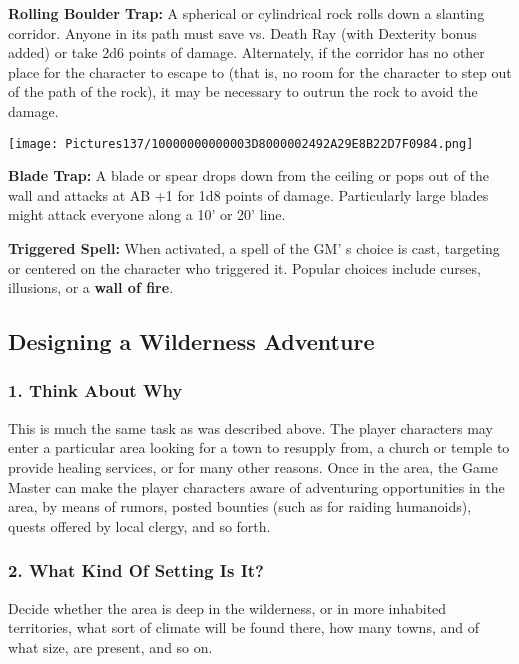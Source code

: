\documentclass[a4paper,twoside,openany,10pt]{book}
\begin{document}
\begin{multicols}{2}
\textbf{Rolling Boulder Trap:} A spherical or cylindrical rock rolls down a slanting corridor. Anyone in its path must save vs. Death Ray (with Dexterity bonus added) or take 2d6 points of damage. Alternately, if the corridor has no other place for the character to escape to (that is, no room for the character to step out of the path of the rock), it may be necessary to outrun the rock to avoid the damage.

\begin{center}
	\texttt{[image: Pictures137/10000000000003D8000002492A29E8B22D7F0984.png]}
\end{center}

\textbf{Blade Trap:} A blade or spear drops down from the ceiling or pops out of the wall and attacks at AB +1 for 1d8 points of damage. Particularly large blades might attack everyone along a 10' or 20' line.

\textbf{Triggered Spell:} When activated, a spell of the GM' s choice is cast, targeting or centered on the character who triggered it. Popular choices include curses, illusions, or a \textbf{wall of fire}.

\subsection{Designing a Wilderness Adventure}\label{designing-a-wilderness-adventure}

\subsubsection{1. Think About Why}\label{think-about-why-1}

This is much the same task as was described above. The player characters may enter a particular area looking for a town to resupply from, a church or temple to provide healing services, or for many other reasons. Once in the area, the Game Master can make the player characters aware of adventuring opportunities in the area, by means of rumors, posted bounties (such as for raiding humanoids), quests offered by local clergy, and so forth.

\subsubsection{2. What Kind Of Setting Is It?}\label{what-kind-of-setting-is-it-1}

Decide whether the area is deep in the wilderness, or in more inhabited territories, what sort of climate will be found there, how many towns, and of what size, are present, and so on.


\end{multicols}
\end{document}
